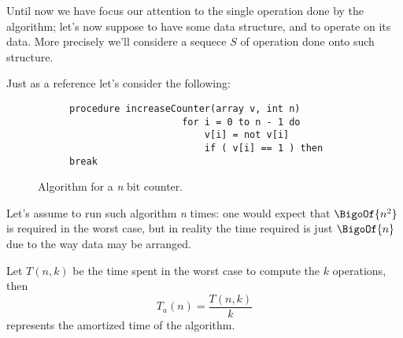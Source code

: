 \documentclass{subfiles}
\begin{document}
    Until now we have focus our attention to the single operation done by the algorithm;
    let's now suppose to have some data structure, and to operate on its data. 
    More precisely we'll considere a sequece \(S\) of operation done onto such structure.

    Just as a reference let's consider the following:
    \begin{figure}[!hb]
        \centering
        \begin{subfigure}{0.55\textwidth}
            \begin{lstlisting}[language=PSEUDO]
                procedure increaseCounter(array v, int n)
                    for i = 0 to n - 1 do
                        v[i] = not v[i]
                        if ( v[i] == 1 ) then break 
            \end{lstlisting}
        \end{subfigure}
        \caption{Algorithm for a \emph{n} bit counter.}
    \end{figure}
    Let's assume to run such algorithm \emph{n} times: one would expect that \(\BigoOf{n^{2}}\) is required in the worst case, 
    but in reality the time required is just \(\BigoOf{n}\) due to the way data may be arranged.
    \begin{definition*}
        Let \(T(n ,k)\) be the time spent in the worst case to compute the \(k\)
        operations, then 
        \[
            T_{a}(n) = \frac{T(n, k)}{k}
        \]
        represents the amortized time of the algorithm.
    \end{definition*}
\end{document}

